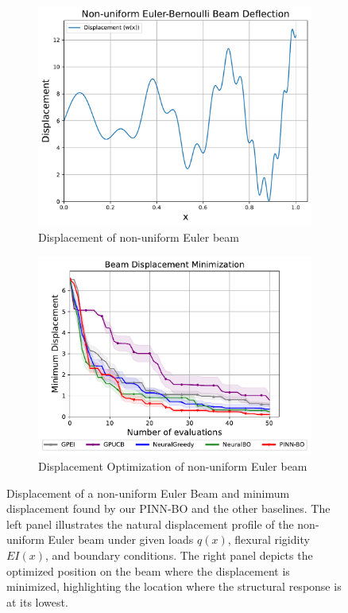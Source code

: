 \begin{figure}[H]
    \centering
    \begin{subfigure}[t]{0.44\textwidth}
        \centering
    \includegraphics[width=\textwidth]{Figures/PINN-BO/beam.pdf}
    \caption{Displacement of non-uniform Euler beam}
     \label{fig:beam_illustration}
    \end{subfigure}
    \hfill
    \begin{subfigure}[t]{0.49\textwidth}
        \centering
        \includegraphics[width=1\textwidth]{Figures/PINN-BO/BeamDeflection_dim_1.pdf}
        \caption{Displacement Optimization of non-uniform Euler beam}
        \label{fig:beam_opt}
    \end{subfigure}
    \caption{Displacement of a non-uniform Euler Beam and minimum displacement found by our PINN-BO and the other baselines. The left panel illustrates the natural displacement profile of the non-uniform Euler beam under given loads $q(x)$,  flexural rigidity $EI(x)$, and boundary conditions. The right panel depicts the optimized position on the beam where the displacement is minimized, highlighting the location where the structural response is at its lowest.}
    \label{fig:beam}
\end{figure}

  

  
